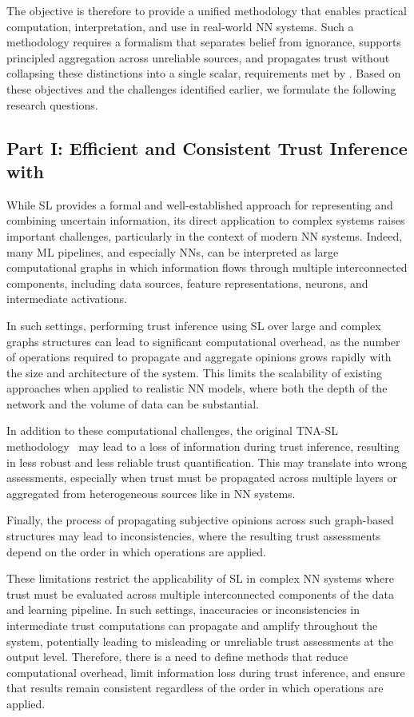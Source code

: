 The objective is therefore to provide a unified methodology that enables practical computation, interpretation, and use in real-world \ac{NN} systems. Such a methodology requires a formalism that separates belief from ignorance, supports principled aggregation across unreliable sources, and propagates trust without collapsing these distinctions into a single scalar, requirements met by . Based on these objectives and the challenges identified earlier, we formulate the following research questions.

\subsection{Part I: Efficient and Consistent Trust Inference with }

While \ac{SL} provides a formal and well-established approach for representing and combining uncertain information, its direct application to complex systems raises important challenges, particularly in the context of modern \ac{NN} systems. 
Indeed, many \ac{ML} pipelines, and especially \acp{NN}, can be interpreted as large computational graphs in which information flows through multiple interconnected components, including data sources, feature representations, neurons, and intermediate activations.

In such settings, performing trust inference using \ac{SL} over large and complex graphs structures can lead to significant computational overhead, as the number of operations required to propagate and aggregate opinions grows rapidly with the size and architecture of the system. 
This limits the scalability of existing approaches when applied to realistic \ac{NN} models, where both the depth of the network and the volume of data can be substantial.

In addition to these computational challenges, the original \acf{TNA-SL} methodology~\cite{10.5555/1151699.1151710} may lead to a loss of information during trust inference, resulting in less robust and less reliable trust quantification. This may translate into wrong assessments, especially when trust must be propagated across multiple layers or aggregated from heterogeneous sources  like in \ac{NN} systems.

Finally, the process of propagating subjective opinions across such graph-based structures may lead to inconsistencies, where the resulting trust assessments depend on the order in which operations are applied. 

These limitations restrict the applicability of \ac{SL} in complex \ac{NN} systems where trust must be evaluated across multiple interconnected components of the data and learning pipeline. In such settings, inaccuracies or inconsistencies in intermediate trust computations can propagate and amplify throughout the system, potentially leading to misleading or unreliable trust assessments at the output level. Therefore, there is a need to define methods that reduce computational overhead, limit information loss during trust inference, and ensure that results remain consistent regardless of the order in which operations are applied.

